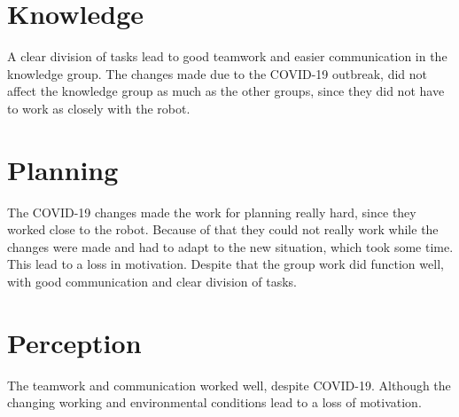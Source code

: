 \documentclass[main.tex]{subfiles}
\begin{document}
\section{Knowledge}

A clear division of tasks lead to good teamwork and easier communication in the knowledge group.
The changes made due to the COVID-19 outbreak, did not affect the knowledge group as much as the other groups, since they did not have to work as closely with the robot.

\section{Planning}

The COVID-19 changes made the work for planning really hard, since they worked close to the robot. Because of that they could not really work while the changes were made and had to adapt to the new situation, which took some time.
This lead to a loss in motivation. Despite that the group work did function well, with good communication and clear division of tasks.

\section{Perception}

The teamwork and communication worked well, despite COVID-19. Although the changing working and environmental conditions lead to a loss of motivation.


	
\end{document}
